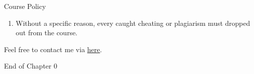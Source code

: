 \documentclass{beamer}
\begin{document}
\begin{frame}{Course Policy}
\begin{enumerate}
\pause
\item Without a specific reason, every caught cheating or plagiarism must dropped out from the course. \\
\end{enumerate}
\end{frame}
\begin{frame}{}
\begin{center}
\Large{Feel free to contact me via \href{mailto:politics.tchsiao@gmail.com}{here}.}
\end{center}
\end{frame}
\begin{frame}{}
\begin{center}
\Large{End of Chapter 0}
\end{center}
\end{frame}
\end{document}
